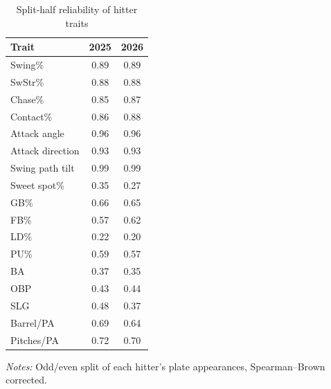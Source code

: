 \begin{table}[H]
\centering
\caption{Split-half reliability of hitter traits}
\label{tab:reliab}
\begin{tabular}{lcc}
\toprule
Trait & 2025 & 2026 \\
\midrule
Swing\% & 0.89 & 0.89 \\
SwStr\% & 0.88 & 0.88 \\
Chase\% & 0.85 & 0.87 \\
Contact\% & 0.86 & 0.88 \\
Attack angle & 0.96 & 0.96 \\
Attack direction & 0.93 & 0.93 \\
Swing path tilt & 0.99 & 0.99 \\
Sweet spot\% & 0.35 & 0.27 \\
GB\% & 0.66 & 0.65 \\
FB\% & 0.57 & 0.62 \\
LD\% & 0.22 & 0.20 \\
PU\% & 0.59 & 0.57 \\
BA & 0.37 & 0.35 \\
OBP & 0.43 & 0.44 \\
SLG & 0.48 & 0.37 \\
Barrel/PA & 0.69 & 0.64 \\
Pitches/PA & 0.72 & 0.70 \\
\bottomrule
\end{tabular}

\vspace{4pt}
\begin{minipage}{0.8\textwidth}
\centering\footnotesize
\textit{Notes:} Odd/even split of each hitter's plate appearances, Spearman--Brown corrected.
\end{minipage}
\end{table}
